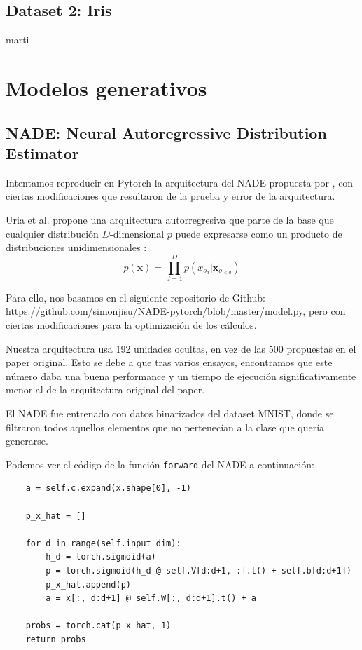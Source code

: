 \documentclass[11pt]{article}
\begin{document}
\subsection{Dataset 2: Iris}
marti

\newpage

\section{Modelos generativos}
\subsection{NADE: Neural Autoregressive Distribution Estimator}

Intentamos reproducir en Pytorch la arquitectura del NADE propuesta por \cite{nade}, con ciertas modificaciones que resultaron de la prueba y error de la arquitectura.

Uria et al. propone una arquitectura autorregresiva que parte de la base que cualquier distribución $D$-dimensional $p$ puede expresarse como un producto de distribuciones unidimensionales \cite{nade}:
$$
p(\boldsymbol{x}) = \prod_{d=1}^{D}p(x_{o_d} | \boldsymbol{x}_{o_{<d}})
$$

Para ello, nos basamos en el siguiente repositorio de Github: \url{https://github.com/simonjisu/NADE-pytorch/blob/master/model.py}, pero con ciertas modificaciones para la optimización de los cálculos.

Nuestra arquitectura usa 192 unidades ocultas, en vez de las 500 propuestas en el paper original. Esto se debe a que tras varios ensayos, encontramos que este número daba una buena performance y un tiempo de ejecución significativamente menor al de la arquitectura original del paper. 

El NADE fue entrenado con datos binarizados del dataset MNIST, donde se filtraron todos aquellos elementos que no pertenecían a la clase que quería generarse.

Podemos ver el código de la función \texttt{forward} del NADE a continuación:

\begin{verbatim}
    a = self.c.expand(x.shape[0], -1)

    p_x_hat = []

    for d in range(self.input_dim):
        h_d = torch.sigmoid(a)
        p = torch.sigmoid(h_d @ self.V[d:d+1, :].t() + self.b[d:d+1])
        p_x_hat.append(p)
        a = x[:, d:d+1] @ self.W[:, d:d+1].t() + a

    probs = torch.cat(p_x_hat, 1)
    return probs
\end{verbatim}
\end{document}
